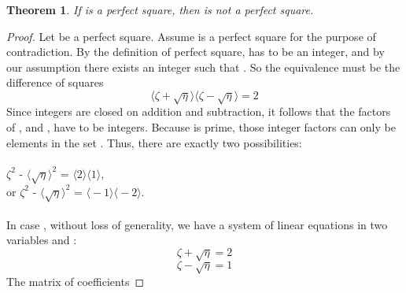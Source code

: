\documentclass[preview]{standalone}
\newtheorem{theorem}{Theorem}
\begin{document}
\begin{theorem} %
    If \bm{$\eta$} is a perfect square, 
    then  is not a perfect square.
\end{theorem}

\begin{proof}
    Let \bm{$\eta$} be a perfect square. 
    Assume  is a perfect square for the purpose of contradiction. 
    By the definition of perfect square, 
    \bm{$\sqrt{\eta}$} has to be an integer, 
    and by our assumption there exists an integer \bm{$\zeta$} such that 
    . 
    So the equivalence 
    must be the difference of squares 
    \begin{equation*}
        \big \langle \zeta + \sqrt{\eta} \big \rangle 
        \big \langle \zeta - \sqrt{\eta} \big \rangle 
            =
        2
    \end{equation*}
    Since integers are closed on addition and subtraction, 
    it follows that the factors of , 
    \bm{$\big \langle \zeta \textbf{ + } \sqrt{\eta} \big \rangle$} and 
    \bm{$\big \langle \zeta \textbf{ - } \sqrt{\eta} \big \rangle$}, 
    have to be integers. 
    Because  is prime, those integer factors can only be elements in the set
    . Thus, there are exactly two possibilities:
    \\ \\ \indent \indent {} $\zeta ^2 \textbf{ - } \big \langle \sqrt{\eta} \big \rangle ^2 \textbf{ = } 
                            \big \langle 2 \big \rangle \big \langle 1 \big \rangle$,
    \\ \indent \indent or  $\zeta ^2 \textbf{ - } \big \langle \sqrt{\eta} \big \rangle ^2 \textbf{ = } 
                            \big \langle -1 \big \rangle \big \langle -2 \big \rangle.$
    \\ \\ In case , without loss of generality, 
    we have a system of linear equations in two variables \bm{$\zeta$} and \bm{$\sqrt{\eta}$}:
    \begin{equation*}
        \zeta + \sqrt{\eta} = 2
    \end{equation*}
    \begin{equation*}
        \zeta - \sqrt{\eta} = 1
    \end{equation*}
    The matrix of coefficients 

\end{proof}
\end{document}
